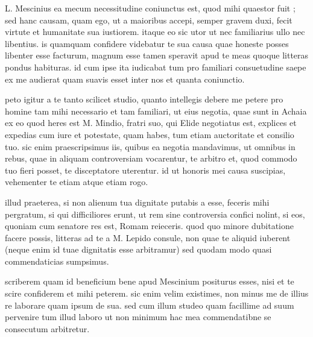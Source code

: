 


 L. Mescinius ea mecum necessitudine coniunctus est, quod mihi quaestor fuit ; sed hanc causam, quam ego, ut a maioribus accepi, semper gravem duxi, fecit virtute et humanitate sua iustiorem. itaque eo sic utor ut nec familiarius ullo nec libentius. is quamquam confidere videbatur te sua causa quae honeste posses libenter esse facturum, magnum esse tamen speravit apud te meas quoque litteras pondus habituras. id cum ipse ita iudicabat tum pro familiari consuetudine saepe ex me audierat quam suavis esset inter nos et quanta coniunctio.

 peto igitur a te tanto scilicet studio, quanto intellegis debere me petere pro homine tam mihi necessario et tam familiari, ut eius negotia, quae sunt in Achaia ex eo quod heres est M. Mindio, fratri suo, qui Elide negotiatus est, explices et expedias cum iure et potestate, quam habes, tum etiam auctoritate et consilio tuo. sic enim praescripsimus iis, quibus ea negotia mandavimus, ut omnibus in rebus, quae in aliquam controversiam vocarentur, te arbitro et, quod commodo tuo fieri posset, te disceptatore uterentur. id ut honoris mei causa suscipias, vehementer te etiam atque etiam rogo.

 illud praeterea, si non alienum tua dignitate putabis a esse, feceris mihi pergratum, si qui difficiliores erunt, ut rem sine controversia confici nolint, si eos, quoniam cum senatore res est, Romam reieceris. quod quo minore dubitatione facere possis, litteras ad te a M. Lepido consule, non quae te aliquid iuberent (neque enim id tuae dignitatis esse arbitramur) sed quodam modo quasi commendaticias sumpsimus.

 scriberem quam id beneficium bene apud Mescinium positurus esses, nisi et te scire confiderem et mihi peterem. sic enim velim existimes, non minus me de illius re laborare quam ipsum de sua. sed cum illum studeo quam facillime ad suum pervenire tum illud laboro ut non minimum hac mea commendatibne se consecutum arbitretur.
